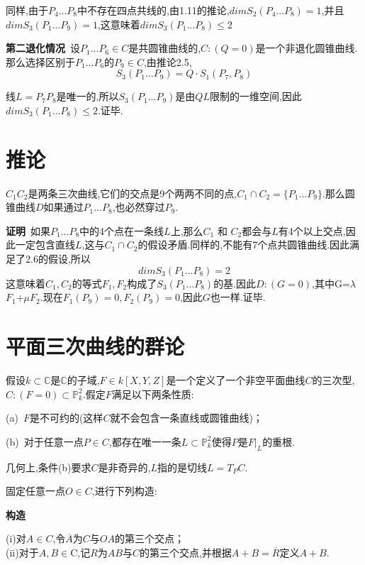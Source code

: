 \documentclass[UTF8]{book}
\begin{document}
		
		同样,由于$P_{4}...P_{8}$中不存在四点共线的,由1.11的推论,$dim S_{2}(P_{4} ... P_{8} )=1$,并且$dim S_{3}(P_{1} ... P_{9} )=1$,这意味着$dim S_{3}(P_{1} ... P_{8})\le 2$
		
		
		\textbf{第二退化情况}\ 设$P_{1} ... P_{6} \in C$是共圆锥曲线的,$ C:(Q=0) $是一个非退化圆锥曲线.那么选择区别于$P_{1} ... P_{6}$的$P_{9} \in C$,由推论2.5,
		\begin{equation*}
		S_{3}(P_{1} ... P_{9} )=Q· S_{1} (P_{7},P_{8} )
		\end{equation*}
	
	
		线$L= P_{7} P_{8}$是唯一的,所以$S_{3}(P_{1}...P_{9})$是由$ QL $限制的一维空间,因此$dim S_{3}(P_{1} ... P_{8})\le 2$.证毕.
	\section{推论}
		$C_{1} C_{2}$是两条三次曲线,它们的交点是9个两两不同的点,$C_{1} \cap C_{2} =\{ P_{1} ... P_{9} \}$.那么圆锥曲线$ D $如果通过$P_{1} ... P_{8}$,也必然穿过$P_{9}$.
		
		
		\textbf{证明}\ 如果$P_{1} ... P_{8}$中的4个点在一条线$ L $上,那么$C_{1}$ 和 $ C_{2}$都会与$ L $有4个以上交点,因此一定包含直线$ L $,这与$C_{1}\cap C_{2}$的假设矛盾.同样的,不能有7个点共圆锥曲线.因此满足了2.6的假设,所以
		\begin{equation*}
		dim S_{3}\left(P_{1} \ldots P_{8}\right)=2
		\end{equation*} 
		这意味着$C_{1},C_{2}$的等式$F_{1},F_{2}$构成了$S_{3}(P_{1} ... P_{8} )$的基.因此$ D:(G=0) $,其中G=$\lambda$$F_{1}$+$\mu$$F_{2}$.现在$F_{1}(P_{9}) = 0,F_{2}(P_{9}) = 0$,因此$ G $也一样.证毕.
	\section{平面三次曲线的群论}
		假设$ k \subset \mathbb{C} $是$ \mathbb{C} $的子域,$ F \in k[X,Y,Z] $是一个定义了一个非空平面曲线$ C $的三次型,$C:(F=0) \subset \mathbb{P}^{2}_{k}$.假定$ F $满足以下两条性质:
		
		
		(a)\ $ F $是不可约的(这样$ C $就不会包含一条直线或圆锥曲线)；
		
		
		(b)\ 对于任意一点$ P \in C $,都存在唯一一条$L \subset \mathbb{P}^{2}_{k}$使得$ P $是$F|_{L}$的重根.
		
		
		几何上,条件(b)要求$ C $是非奇异的,$ L $指的是切线$L=T_{P} C$.
		
		
		固定任意一点$ O \in C $,进行下列构造:
		
		
		\textbf{构造}\ 
		\begin{minipage}[t]{0.9\linewidth}
			(i)对$ A \in C $,令$\overline{A}$为$ C $与$ OA $的第三个交点；\\
			(ii)对于$A,B\in$C,记$ R $为$ AB $与$ C $的第三个交点,并根据$A+B=\overline{R}$定义$ A+B $.
		\end{minipage}
		
\end{document}
